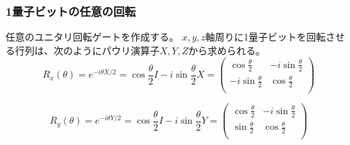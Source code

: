 \subsubsection{1量子ビットの任意の回転}
任意のユニタリ回転ゲートを作成する。
$x, y, z$軸周りに1量子ビットを回転させる行列は、次のようにパウリ演算子$X, Y, Z$から求められる。
\begin{equation}
    R_x(\theta) = e^{-i \theta X / 2} = \cos{\frac{\theta}{2}}I - i \sin{\frac{\theta}{2}} X = \begin{pmatrix}
        \cos{\frac{\theta}{2}} & -i \sin{\frac{\theta}{2}} \\
        -i \sin{\frac{\theta}{2}} & \cos{\frac{\theta}{2}} \\
    \end{pmatrix}
\end{equation}

\begin{equation}
    R_y(\theta) = e^{-i \theta Y / 2} = \cos{\frac{\theta}{2}} I - i \sin{\frac{\theta}{2}} Y =  \begin{pmatrix}
        \cos{\frac{\theta}{2}} & -i\sin{\frac{\theta}{2}} \\
        \sin{\frac{\theta}{2}} & \cos{\frac{\theta}{2}} \\
    \end{pmatrix}
\end{equation}

